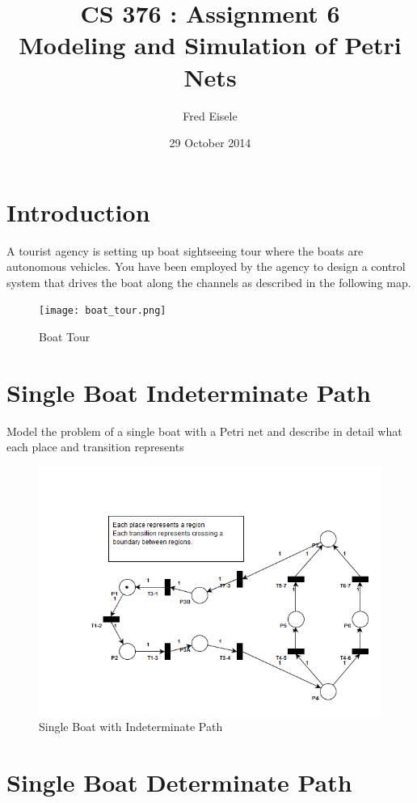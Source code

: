 \documentclass{article}
\title{CS 376 : Assignment 6 \\
Modeling and Simulation of Petri Nets}
\author{Fred Eisele }
\date{29 October 2014}
\begin{document}
\maketitle

\section{Introduction}
A tourist agency is setting up boat sightseeing tour
where the boats are autonomous vehicles.
You have been employed by the agency to design a control
system that drives the boat along the channels
as described in the following map.


\begin{figure}[h!]
\centering
\texttt{[image: boat\_tour.png]}
\caption{Boat Tour}
\label{fig:boat-tour}
\end{figure}

\section{Single Boat Indeterminate Path}

Model the problem of a single boat with a Petri net
and describe in detail what each place and transition represents

\begin{figure}[h!]
\centering
\includegraphics[scale=0.5]{hw6_petri_net_1.png}
\caption{Single Boat with Indeterminate Path}
\label{fig:pn1}
\end{figure}

\section{Single Boat Determinate Path}
\end{document}
